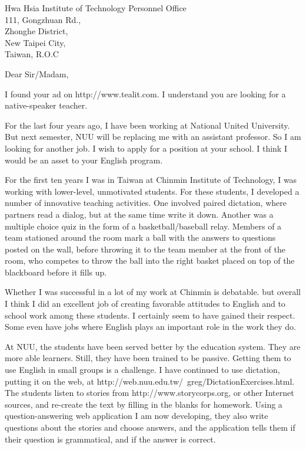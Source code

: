 \documentclass{letter}
\begin{document}
\begin{letter}{
Hwa Hsia Institute of Technology Personnel Office \\ 111, Gongzhuan Rd., \\ Zhonghe District, \\ New Taipei City, \\ Taiwan, R.O.C}
\opening{Dear Sir/Madam,}

I found your ad on http://www.tealit.com. I understand you are looking for a native-speaker teacher.

For the last four years ago, I have been working at National United University. But next semester, NUU will be replacing me with an assistant professor. So I am looking for another job. I wish to apply for a position at your school. I think I would be an asset to your English program.

For the first ten years I was in Taiwan at Chinmin Institute of Technology, I was working with lower-level, unmotivated students. For these students, I developed a number of innovative teaching activities. One involved paired dictation, where partners read a dialog, but at the same time write it down. Another was a multiple choice quiz in the form of a basketball/baseball relay. Members of a team stationed around the room mark a ball with the answers to questions posted on the wall, before throwing it to the team member at the front of the room, who competes to throw the ball into the right basket placed on top of the blackboard before it fills up.

Whether I was successful in a lot of my work at Chinmin is debatable. but overall I think I did an excellent job of creating favorable attitudes to English and to school work among these students. I certainly seem to have gained their respect. Some even have jobs where English plays an important role in the work they do.

At NUU, the students have been served better by the education system. They are more able learners. Still, they have been trained to be passive. Getting them to use English in small groups is a challenge. I have continued to use dictation, putting it on the web, at http://web.nuu.edu.tw/~greg/DictationExercises.html. The students listen to stories from http://www.storycorps.org, or other Internet sources, and re-create the text by filling in the blanks for homework. Using a question-answering web application I am now developing, they also write questions about the stories and choose answers, and the application tells them if their question is grammatical, and if the answer is correct.


\end{letter}
\end{document}
